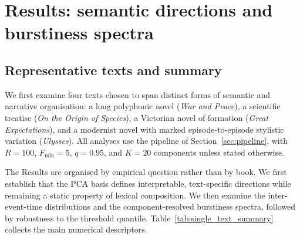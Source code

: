 \documentclass[preprint]{elsarticle}
\begin{document}

\section{Results: semantic directions and burstiness spectra}
\label{sec:oliver}

\subsection{Representative texts and summary}
\label{sec:representative_summary}

We first examine four texts chosen to span distinct forms of semantic
and narrative organisation: a long polyphonic novel (\emph{War and
Peace}), a scientific treatise (\emph{On the Origin of Species}), a
Victorian novel of formation (\emph{Great Expectations}), and a
modernist novel with marked episode-to-episode stylistic variation
(\emph{Ulysses}). All analyses use the pipeline of
Section~\ref{sec:pipeline}, with $R=100$, $F_{\min}=5$, $q=0.95$, and
$K=20$ components unless stated otherwise.

The Results are organised by empirical question rather than by book.
We first establish that the PCA basis defines interpretable,
text-specific directions while remaining a static property of lexical
composition. We then examine the inter-event-time distributions and the
component-resolved burstiness spectra, followed by robustness to the
threshold quantile. Table~\ref{tab:single_text_summary} collects the
main numerical descriptors.
\end{document}
